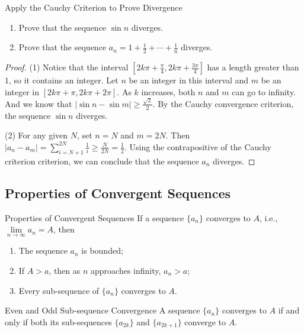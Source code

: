 \begin{example}{Apply the Cauchy Criterion to Prove Divergence}{}
  \begin{enumerate}
  \item Prove that the sequence $\sin n$ diverges.
  \item Prove that the sequence $a_n = 1 + \frac{1}{2} + \cdots + \frac{1}{n}$ diverges.
  \end{enumerate}
\end{example}

\begin{proof}
  (1) Notice that the interval $[2k\pi + \frac{\pi}{4}, 2k\pi + \frac{3\pi}{4}]$
  has a length greater than $1$, so it contains an integer.
  Let $n$ be an integer in this interval
  and $m$ be an integer in $[2k\pi + \pi, 2k\pi + 2\pi]$.
  As $k$ increases, both $n$ and $m$ can go to infinity.
  And we know that $|\sin n - \sin m| \geq \frac{\sqrt{2}}{2}$.
  By the Cauchy convergence criterion, the sequence $\sin n$ diverges.

  (2) For any given $N$, set $n = N$ and $m = 2N$.
  Then $|a_n - a_m| = \sum\limits_{i = N + 1}^{2N} \frac{1}{i} \geq \frac{N}{2N}
  = \frac{1}{2}$.
  Using the contrapositive of the Cauchy criterion criterion,
  we can conclude that the sequence $a_n$ diverges.
\end{proof}

\subsection{Properties of Convergent Sequences}

\begin{proposition}{Properties of Convergent Sequences}{}
  If a sequence $\{a_n\}$ converges to $A$, i.e.,
  $\lim \limits _{n \rightarrow \infty} a_n = A$, then
  \begin{enumerate}
  \item The sequence $a_n$ is bounded;
  \item If $A > a$, then as $n$ approaches infinity, $a_n > a$;
  \item Every sub-sequence of $\{a_n\}$ converges to $A$.
  \end{enumerate}
\end{proposition}

\begin{theorem}{Even and Odd Sub-sequence Convergence}{}
  A sequence $\{a_n\}$ converges to $A$ if and only if both its sub-sequences
  $\{a_{2k}\}$ and $\{a_{2k+1}\}$ converge to $A$.
\end{theorem}

